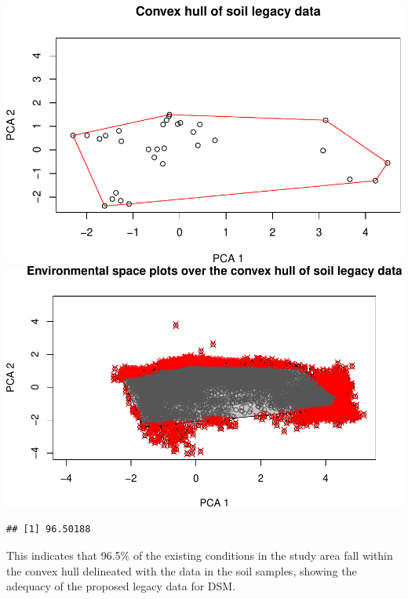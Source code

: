 \documentclass[
]{book}
\begin{document}
\includegraphics{Technical-Manual-Soil-Sampling-Design_files/figure-latex/fig-4-1.pdf} \includegraphics{Technical-Manual-Soil-Sampling-Design_files/figure-latex/fig-4-2.pdf}

\begin{verbatim}
## [1] 96.50188
\end{verbatim}

This indicates that 96.5\% of the existing conditions in the study area fall within the convex hull delineated with the data in the soil samples, showing the adequacy of the proposed legacy data for DSM.
\end{document}
